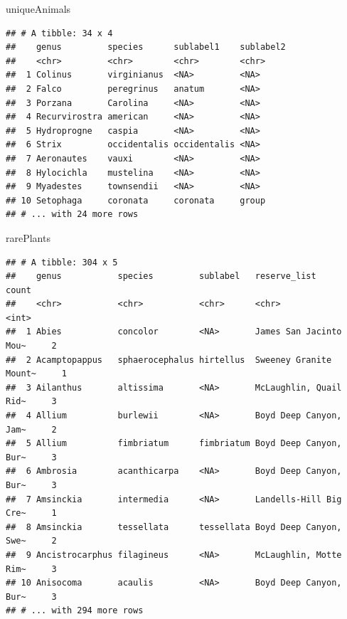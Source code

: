 \documentclass[]{article}
\newenvironment{Shaded}{\begin{snugshade}}{\end{snugshade}}
\newcommand{\NormalTok}[1]{#1}
\begin{document}
\begin{Shaded}
\begin{Highlighting}[]
\NormalTok{uniqueAnimals}
\end{Highlighting}
\end{Shaded}

\begin{verbatim}
## # A tibble: 34 x 4
##    genus         species      sublabel1    sublabel2
##    <chr>         <chr>        <chr>        <chr>    
##  1 Colinus       virginianus  <NA>         <NA>     
##  2 Falco         peregrinus   anatum       <NA>     
##  3 Porzana       Carolina     <NA>         <NA>     
##  4 Recurvirostra american     <NA>         <NA>     
##  5 Hydroprogne   caspia       <NA>         <NA>     
##  6 Strix         occidentalis occidentalis <NA>     
##  7 Aeronautes    vauxi        <NA>         <NA>     
##  8 Hylocichla    mustelina    <NA>         <NA>     
##  9 Myadestes     townsendii   <NA>         <NA>     
## 10 Setophaga     coronata     coronata     group    
## # ... with 24 more rows
\end{verbatim}

\begin{Shaded}
\begin{Highlighting}[]
\NormalTok{rarePlants}
\end{Highlighting}
\end{Shaded}

\begin{verbatim}
## # A tibble: 304 x 5
##    genus           species         sublabel   reserve_list           count
##    <chr>           <chr>           <chr>      <chr>                  <int>
##  1 Abies           concolor        <NA>       James San Jacinto Mou~     2
##  2 Acamptopappus   sphaerocephalus hirtellus  Sweeney Granite Mount~     1
##  3 Ailanthus       altissima       <NA>       McLaughlin, Quail Rid~     3
##  4 Allium          burlewii        <NA>       Boyd Deep Canyon, Jam~     2
##  5 Allium          fimbriatum      fimbriatum Boyd Deep Canyon, Bur~     3
##  6 Ambrosia        acanthicarpa    <NA>       Boyd Deep Canyon, Bur~     3
##  7 Amsinckia       intermedia      <NA>       Landells-Hill Big Cre~     1
##  8 Amsinckia       tessellata      tessellata Boyd Deep Canyon, Swe~     2
##  9 Ancistrocarphus filagineus      <NA>       McLaughlin, Motte Rim~     3
## 10 Anisocoma       acaulis         <NA>       Boyd Deep Canyon, Bur~     3
## # ... with 294 more rows
\end{verbatim}
\end{document}
